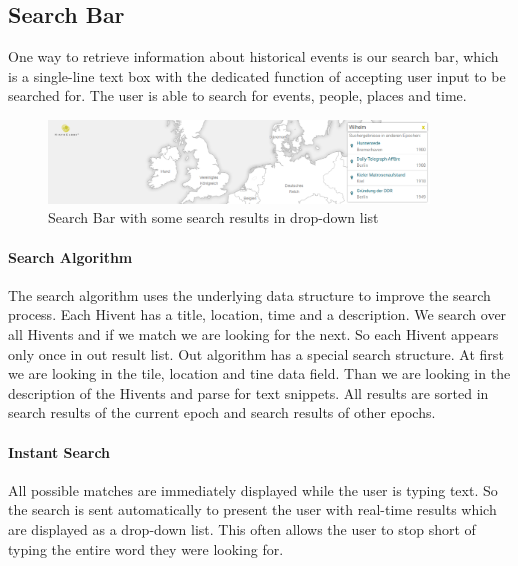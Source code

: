 \subsection{Search Bar} %
\label{sub:search_bar}

One way to retrieve information about historical events is our search bar, which is a single-line text box with the dedicated function of accepting user input to be searched for. The user is able to search for events, people, places and time.

\begin{figure}[H]
  \begin{center}
    \includegraphics[width=0.9\textwidth]{graphics/search.png}
  \end{center}
  \caption{Search Bar with some search results in drop-down list}
  \label{fig:search}
\end{figure}

\paragraph{Search Algorithm}
\label{par:search_alg}
The search algorithm uses the underlying data structure to improve the search process. Each Hivent has a title, location, time and a description. We search over all Hivents and if we match we are looking for the next. So each Hivent appears only once in out result list. Out algorithm has a special search structure. At first we are looking in the tile, location and tine data field. Than we are looking in the description of the Hivents and parse for text snippets. All results are sorted in search results of the current epoch and search results of other epochs.

\paragraph{Instant Search} %
\label{par:instant_search}
All possible matches are immediately displayed while the user is typing text. So the search is sent automatically to present the user with real-time results which are displayed as a drop-down list. This often allows the user to stop short of typing the entire word they were looking for.

